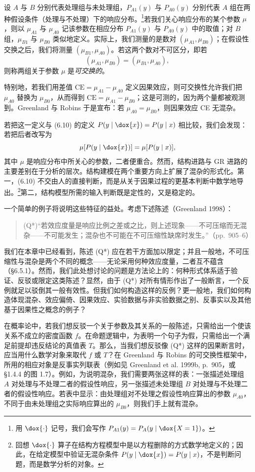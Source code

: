 设 $A$ 与 $B$ 分别代表处理组与未处理组，$P_{A1}(y)$ 与 $P_{A0}(y)$ 分别代表 $A$ 组在两种假设条件（处理与不处理）下的响应分布。\footnote{用 $\dox{\cdot}$ 记号，我们会写作 $P_{A1}(y)=P_A(y\mid \dox{X=1})$。}若我们关心响应分布的某个参数 $\mu$，则以 $\mu_{A1}$ 与 $\mu_{A0}$ 记该参数在相应分布 $P_{A1}(y)$ 与 $P_{A0}(y)$ 中的取值；对 $B$ 组，$\mu_{B1}$ 与 $\mu_{B0}$ 类似地定义。实际上，我们测量的是数对 $(\mu_{A1},\mu_{B0})$；在假设性交换之后，我们将测量 $(\mu_{B1},\mu_{A0})$。若这两个数对不可区分，即若
\[
(\mu_{A1},\mu_{B0}) = (\mu_{B1},\mu_{A0}),
\]
则称两组关于参数 $\mu$ 是\emph{可交换的}。

特别地，若我们用差值 $\mathrm{CE}=\mu_{A1}-\mu_{A0}$ 定义因果效应，则可交换性允许我们把 $\mu_{A0}$ 替换为 $\mu_{B0}$，从而得到 $\mathrm{CE}=\mu_{A1}-\mu_{B0}$；这是可测的，因为两个量都被观测到。Greenland 与 Robins 于是宣布：若 $\mu_{A0}=\mu_{B0}$，则因果效应 CE 无混杂。

若把这一定义与 \textup{(6.10)} 的定义 $P(y\mid \dox{x})=P(y\mid x)$ 相比较，我们会发现：若把后者改写为
\[
\mu[P(y\mid \dox{x})] = \mu[P(y\mid x)],
\]
其中 $\mu$ 是响应分布中所关心的参数，二者便重合。然而，结构进路与 GR 进路的主要差别在于分析的层次。结构建模在两个重要方向上扩展了混杂的形式化。第一，\textup{(6.10)} 不交由人的直接判断，而是从关于因果过程的更基本判断中数学地导出。\footnote{回想 $\dox{\cdot}$ 算子在结构方程模型中是以方程删除的方式数学地定义的；因此，在给定模型中验证无混杂条件 $P(y\mid \dox{x})=P(y\mid x)$，不是判断问题，而是数学分析的对象。}第二，结构模型所需的输入判断既是定性的，又是稳定的。

一个简单的例子将说明这些特征的益处。考虑下述陈述（Greenland 1998）：

\begin{quote}
(Q*)\quad “若效应度量是响应比例之差或之比，则上述现象——不可压缩而无混杂——不可能发生；混杂也不可能在不可压缩性缺席时发生。”（pp.~905--6）
\end{quote}

我们在本章中已经看到，陈述 (Q*) 应在若干方面加以限定；并且一般地，不可压缩性与混杂是两个不同的概念——无论采用何种效应度量，二者互不蕴含（\S 6.5.1）。然而，我们此处想讨论的问题是方法论上的：何种形式体系适于验证、反驳或限定这类陈述？显然，由于 (Q*) 对所有情形作出了一般断言，一个反例就足以驳倒其一般有效性。但我们如何构造这样的反例？更一般地，我们如何构造体现混杂、效应偏倚、因果效应、实验数据与非实验数据之别、反事实以及其他基于因果性之概念的例子？

在概率论中，若我们想反驳一个关于参数及其关系的一般陈述，只需给出一个使该关系不成立的密度函数 $f$。在命题逻辑中，为表明一个句子为假，只需给出一个满足前提却违反结论的真值表 $T$。那么，当我们想反驳像 (Q*) 这样的因果断言时，应当用什么数学对象来取代 $f$ 或 $T$？在 Greenland 与 Robins 的可交换性框架中，所用的相应对象是反事实列联表（例如见 Greenland et al. 1999b, p.~905，或 \S 1.4.4 的图 1.7）。例如，为说明混杂，我们需要两张这样的表：一张描述处理组 $A$ 对处理与不处理二者的假设性响应，另一张描述未处理组 $B$ 对处理与不处理二者的假设性响应。若表中显示：由处理组对不处理之假设性响应算出的参数 $\mu_{A0}$，不同于由未处理组之实际响应算出的 $\mu_{B0}$，则我们手上就有混杂。

